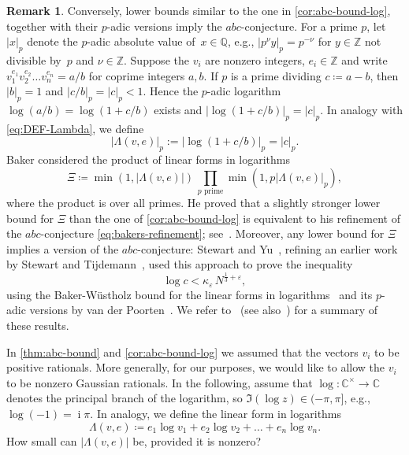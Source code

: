\documentclass[10pt,a4paper]{article}
\theoremstyle{definition}
\newtheorem{remark}[theorem]{Remark}
\DeclareMathOperator{\ii}{i}
\newcommand{\QQ}{\mathbb{Q}}
\newcommand{\CC}{\mathbb{C}}
\newcommand{\ZZ}{\mathbb{Z}}
\numberwithin{equation}{section}
\begin{document}
\begin{remark}
Conversely, lower bounds similar to the one in \cref{cor:abc-bound-log},
together with their $p$-adic versions imply the $abc$-conjecture.
For a prime $p$, let $|x|_p$ denote the $p$-adic absolute value of~$x\in\QQ$,
e.g., $|p^\nu y|_p = p^{-\nu}$ for $y\in\ZZ$ not divisible by~$p$ and $\nu\in\ZZ$.
Suppose the $v_i$ are nonzero integers, $e_i\in\ZZ$ and write
$v_1^{e_1} v_2^{e_2}\dots v_n^{e_n} = a/b$ for coprime integers $a,b$.
If $p$ is a prime dividing $c\coloneqq a-b$,
then $|b|_p=1$ and $|c/b|_p = |c|_p <1$.
Hence the $p$-adic logarithm $\log(a/b)=\log(1+c/b)$ exists %
and $|\log(1+c/b)|_p = |c|_p$.
In analogy with \cref{eq:DEF-Lambda}, %
we define
\[
 |\Lambda(v,e)|_p := |\log(1+c/b)|_p = |c|_p.
\]
Baker considered the product of linear forms in logarithms
\[
 \Xi \coloneqq \min( 1 , |\Lambda(v,e)| ) \, \prod_{p\text{ prime}} \min( 1, p |\Lambda(v,e)|_p) ,
\]
where the product is over all primes.
He proved that a slightly stronger lower bound for $\Xi$ than the one of \cref{cor:abc-bound-log}
is equivalent to his refinement of the $abc$-conjecture \cref{eq:bakers-refinement};
see~\cite[Section~5]{baker98}.
Moreover, any lower bound for $\Xi$ implies a version of the $abc$-conjecture:
Stewart and Yu~\cite{yu-stewart},
refining an earlier work by Stewart and Tijdemann~\cite{stewart_oesterle-masser_1986},
used this approach to prove the inequality
\[
 \log c < \kappa_\varepsilon\, N^{\frac{1}{3}+\varepsilon},
\]
using the Baker-W\"{u}stholz bound for the linear forms in logarithms~\cite{wustholz1993}
and its $p$-adic versions by van der Poorten~\cite{vdpoorten}.
We refer to~\cite[Chapter~3.7]{baker_wustholz_2008}
(see also~\cite{granvilletucker}) for a summary of these results.
\end{remark}

In \cref{thm:abc-bound} and \cref{cor:abc-bound-log}
we assumed that the vectors $v_i$ to be positive rationals.
More generally, for our purposes, we would like to allow the $v_i$ to
be nonzero Gaussian rationals.
In the following, assume that $\log:\CC^\times\rightarrow\CC$ denotes the principal branch of the logarithm,
so $\Im(\log z)\in (-\pi,\pi]$, e.g., $\log(-1)=\ii\pi$.
In analogy, we define  the linear form in logarithms %
\begin{equation}
\label{eq:form-in-log-def}
	\Lambda(v,e)\coloneqq e_1 \log v_1 + e_2\log v_2 +\dots +e_n\log v_n.
\end{equation}
How small can $|\Lambda(v,e)|$ be, provided it is nonzero?
\end{document}
